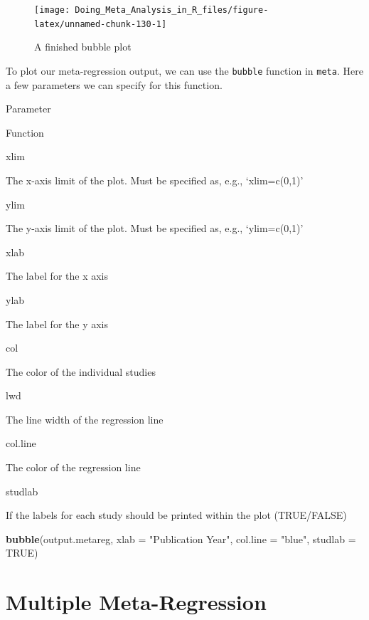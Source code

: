 \documentclass[]{book}
\newenvironment{Shaded}{\begin{snugshade}}{\end{snugshade}}
\newcommand{\DataTypeTok}[1]{\textcolor[rgb]{0.13,0.29,0.53}{#1}}
\newcommand{\KeywordTok}[1]{\textcolor[rgb]{0.13,0.29,0.53}{\textbf{#1}}}
\newcommand{\NormalTok}[1]{#1}
\newcommand{\OtherTok}[1]{\textcolor[rgb]{0.56,0.35,0.01}{#1}}
\newcommand{\StringTok}[1]{\textcolor[rgb]{0.31,0.60,0.02}{#1}}
\begin{document}
\begin{figure}

{\centering \texttt{[image: Doing\_Meta\_Analysis\_in\_R\_files/figure-latex/unnamed-chunk-130-1]} 

}

\caption{A finished bubble plot}\label{fig:unnamed-chunk-130}
\end{figure}

To plot our meta-regression output, we can use the \texttt{bubble} function in \texttt{meta}. Here a few parameters we can specify for this function.

Parameter

Function

xlim

The x-axis limit of the plot. Must be specified as, e.g., `xlim=c(0,1)'

ylim

The y-axis limit of the plot. Must be specified as, e.g., `ylim=c(0,1)'

xlab

The label for the x axis

ylab

The label for the y axis

col

The color of the individual studies

lwd

The line width of the regression line

col.line

The color of the regression line

studlab

If the labels for each study should be printed within the plot (TRUE/FALSE)

\begin{Shaded}
\begin{Highlighting}[]
\KeywordTok{bubble}\NormalTok{(output.metareg,}
       \DataTypeTok{xlab =} \StringTok{"Publication Year"}\NormalTok{,}
       \DataTypeTok{col.line =} \StringTok{"blue"}\NormalTok{,}
       \DataTypeTok{studlab =} \OtherTok{TRUE}\NormalTok{)}
\end{Highlighting}
\end{Shaded}

\hypertarget{multiple-meta-regression}{%
\section{Multiple Meta-Regression}\label{multiple-meta-regression}}
\end{document}

